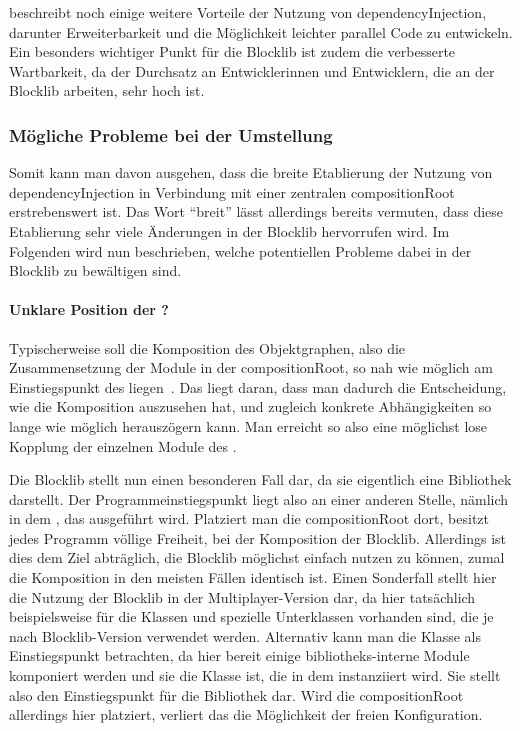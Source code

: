 \textcite[S.~15~ff.]{Seemann2012} beschreibt noch einige weitere Vorteile der Nutzung von \gls{dependencyInjection}, darunter Erweiterbarkeit und die Möglichkeit leichter parallel Code zu entwickeln. Ein besonders wichtiger Punkt für die Blocklib ist zudem die verbesserte Wartbarkeit, da der Durchsatz an Entwicklerinnen und Entwicklern, die an der Blocklib arbeiten, sehr hoch ist.

\subsubsection{Mögliche Probleme bei der Umstellung}

Somit kann man davon ausgehen, dass die breite Etablierung der Nutzung von \gls{dependencyInjection} in Verbindung mit einer zentralen \gls{compositionRoot} erstrebenswert ist. Das Wort \enquote{breit} lässt allerdings bereits vermuten, dass diese Etablierung sehr viele Änderungen in der Blocklib hervorrufen wird. Im Folgenden wird nun beschrieben, welche potentiellen Probleme dabei in der Blocklib zu bewältigen sind.

\paragraph{Unklare Position der ?}
Typischerweise soll die Komposition des Objektgraphen, also die Zusammensetzung der Module in der \gls{compositionRoot}, so nah wie möglich am Einstiegspunkt des  liegen~\cite[S.~232~ff.]{Martin17}\cite[S.~76~f.]{Seemann2012}. Das liegt daran, dass man dadurch die Entscheidung, wie die Komposition auszusehen hat, und zugleich konkrete Abhängigkeiten so lange wie möglich herauszögern kann. Man erreicht so also eine möglichst lose Kopplung der einzelnen Module des .

Die Blocklib stellt nun einen besonderen Fall dar, da sie eigentlich eine Bibliothek darstellt. Der Programmeinstiegspunkt liegt also an einer anderen Stelle, nämlich in dem \classBlockLibProgram{}, das ausgeführt wird. Platziert man die \gls{compositionRoot} dort, besitzt jedes \gls{Programm} völlige Freiheit, bei der Komposition der Blocklib. Allerdings ist dies dem Ziel abträglich, die Blocklib möglichst einfach nutzen zu können, zumal die Komposition in den meisten Fällen identisch ist. Einen Sonderfall stellt hier die Nutzung der Blocklib in der Multiplayer-Version dar, da hier tatsächlich beispielsweise für die Klassen \classWorldInteraction{} und \classContext{} spezielle Unterklassen vorhanden sind, die je nach Blocklib-Version verwendet werden. Alternativ kann man die Klasse \classGame{} als Einstiegspunkt betrachten, da hier bereit einige bibliotheks-interne Module komponiert werden und sie die Klasse ist, die in dem \classBlockLibProgram{} instanziiert wird. Sie stellt also den Einstiegspunkt für die Bibliothek dar. Wird die \gls{compositionRoot} allerdings hier platziert, verliert das \classBlockLibProgram{} die Möglichkeit der freien Konfiguration.

